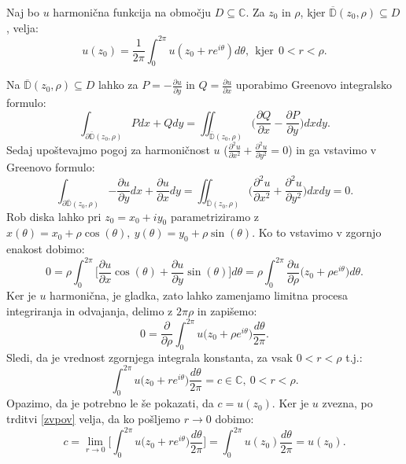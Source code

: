 \documentclass[mat1]{fmfdelo}
\newcommand{\C}{\mathbb C}
\begin{document}
    \begin{trditev}
        Naj bo $u$ harmonična funkcija na območju $D \subseteq \C$. Za $z_0$ in $\rho$, kjer $\overline{\mathbb{D}}(z_0, \rho) \subseteq D$, velja:
            $$
                u(z_0) = \frac{1}{2 \pi} \int_{0}^{2 \pi}{u(z_0 + r e^{i \theta}) d\theta},~~\text{kjer}~~ 0 < r < \rho.
            $$
    \end{trditev}
    \begin{dokaz}
        Na $\overline{\mathbb{D}}(z_0, \rho) \subseteq D$ lahko za $P = -\frac{\partial u}{\partial y}$ in $Q = \frac{\partial u}{\partial x}$ uporabimo Greenovo integralsko formulo:
        $$
            \int_{\partial \overline{\mathbb{D}}(z_0, \rho)}{P dx + Q dy} = \iint_{\overline{\mathbb{D}}(z_0, \rho)}{\bigg(\frac{\partial Q}{\partial x} - \frac{\partial P}{\partial y}\bigg)dx dy}.
        $$ 
        Sedaj upoštevajmo pogoj za harmoničnost $u$ \big($\frac{\partial^2 u}{\partial x^2} + \frac{\partial^2 u}{\partial y^2} = 0$\big) in ga vstavimo v Greenovo formulo:
        $$
        \int_{\partial \overline{\mathbb{D}}(z_0, \rho)}{-\frac{\partial u}{\partial y} dx + \frac{\partial u}{\partial x} dy} = \iint_{\overline{\mathbb{D}}(z_0, \rho)}{\bigg(\frac{\partial^2 u}{\partial x^2} + \frac{\partial^2 u}{\partial y^2}\bigg)dx dy} = 0. 
        $$
        Rob diska lahko pri $z_0 = x_0 + iy_0$ parametriziramo z $x(\theta) = x_0 + \rho \cos(\theta),~y(\theta) = y_0 + \rho \sin(\theta)$. Ko to vstavimo v zgornjo enakost dobimo:
        $$
        0 = \rho \int_{0}^{2 \pi}{\bigg[\frac{\partial u}{\partial x} \cos(\theta) + \frac{\partial u}{\partial y} \sin(\theta)\bigg] d\theta} = \rho \int_{0}^{2\pi}{\frac{\partial u}{\partial \rho}\big({z_0 + \rho e^{i\theta}\big)d\theta}}.
        $$
        Ker je $u$ harmonična, je gladka, zato lahko zamenjamo limitna procesa integriranja in odvajanja, delimo z $2\pi \rho$ in zapišemo:
        $$
        0 = \frac{\partial}{\partial \rho} \int_{0}^{2\pi}{u\big({z_0 + \rho e^{i\theta}\big)\frac{d\theta}{2 \pi}}}.
        $$
        Sledi, da je vrednost zgornjega integrala konstanta, za vsak $0 <r < \rho$ t.j.: 
        $$
        \int_{0}^{2\pi}{u\big({z_0 + r e^{i\theta}\big)\frac{d\theta}{2 \pi}}} = c \in \mathbb{C},~ 0 < r < \rho.
        $$
        Opazimo, da je potrebno le še pokazati, da $c = u(z_0)$.
        Ker je $u$ zvezna, po trditvi \ref{zvpov} velja, da ko pošljemo $r \to 0$ dobimo:
        $$
        c = \lim_{r \to 0}{\bigg[\int_{0}^{2\pi}{u\big({z_0 + r e^{i\theta}\big)\frac{d\theta}{2 \pi}}}\bigg]} = \int_{0}^{2\pi}{{u(z_0)\frac{d\theta}{2 \pi}}} = u(z_0).
        $$
    \end{dokaz}
\end{document}
